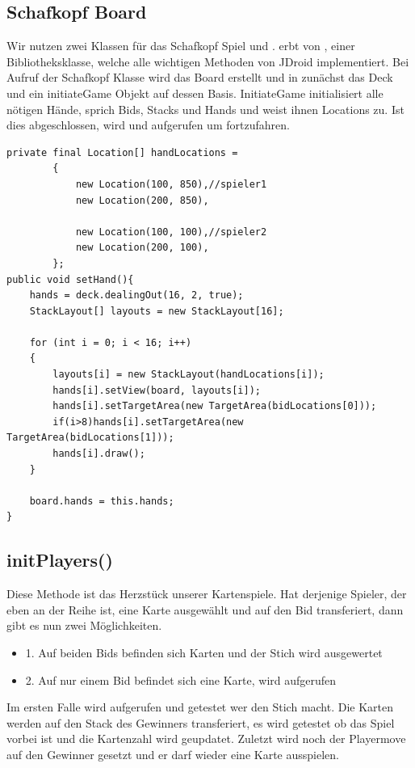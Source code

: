 \subsection{Schafkopf Board}
Wir nutzen zwei Klassen für das Schafkopf Spiel  und .
 erbt von , einer Bibliotheksklasse, welche alle wichtigen Methoden von JDroid implementiert. Bei Aufruf der Schafkopf Klasse wird das Board erstellt und in  zunächst das Deck und ein initiateGame Objekt auf dessen Basis. InitiateGame initialisiert alle nötigen Hände, sprich Bids, Stacks und Hands und weist ihnen Locations zu. Ist dies abgeschlossen, wird  und  aufgerufen um fortzufahren.
\begin{lstlisting}[caption={Beispiel Hands initialisieren},captionpos=b]
private final Location[] handLocations =
        {
            new Location(100, 850),//spieler1
            new Location(200, 850),

            new Location(100, 100),//spieler2
            new Location(200, 100),
        };
public void setHand(){
    hands = deck.dealingOut(16, 2, true);
    StackLayout[] layouts = new StackLayout[16];

    for (int i = 0; i < 16; i++)
    {
        layouts[i] = new StackLayout(handLocations[i]);
        hands[i].setView(board, layouts[i]);
        hands[i].setTargetArea(new TargetArea(bidLocations[0]));
        if(i>8)hands[i].setTargetArea(new TargetArea(bidLocations[1]));
        hands[i].draw();
    }

    board.hands = this.hands;
}

\end{lstlisting}

\subsection{initPlayers()}

Diese Methode ist das Herzstück unserer Kartenspiele. Hat derjenige Spieler, der eben an der Reihe ist, eine Karte ausgewählt und auf den Bid transferiert, dann gibt es nun zwei Möglichkeiten.
\begin{itemize}
	\item 1. Auf beiden Bids befinden sich Karten und der Stich wird ausgewertet
	\item 2. Auf nur einem Bid befindet sich eine Karte,  wird 		 aufgerufen
\end{itemize}
Im ersten Falle wird  aufgerufen und getestet wer den Stich
macht.  Die Karten werden auf den Stack des Gewinners transferiert, es wird
getestet ob das Spiel vorbei ist und die Kartenzahl wird geupdatet. Zuletzt wird
noch der Playermove auf den Gewinner gesetzt und er darf wieder eine Karte
ausspielen.

